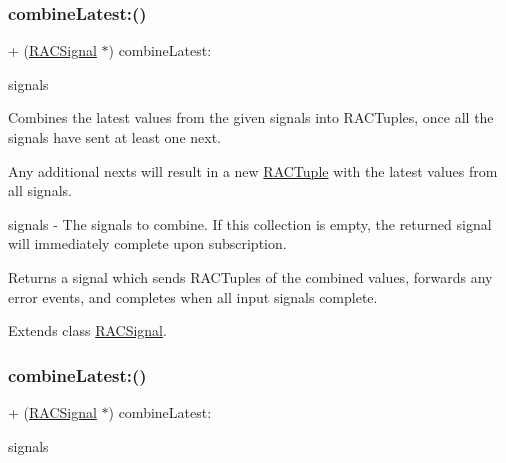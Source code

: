 \subsubsection{\texorpdfstring{combine\+Latest\+:()}{combineLatest:()}\hspace{0.1cm}{\footnotesize\ttfamily [2/3]}}
{\footnotesize\ttfamily + (\mbox{\hyperlink{interface_r_a_c_signal}{R\+A\+C\+Signal}} $\ast$) combine\+Latest\+: \begin{DoxyParamCaption}\item[{(id$<$ N\+S\+Fast\+Enumeration $>$)}]{signals }\end{DoxyParamCaption}}

Combines the latest values from the given signals into R\+A\+C\+Tuples, once all the signals have sent at least one {\ttfamily next}.

Any additional {\ttfamily next}s will result in a new \mbox{\hyperlink{interface_r_a_c_tuple}{R\+A\+C\+Tuple}} with the latest values from all signals.

signals -\/ The signals to combine. If this collection is empty, the returned signal will immediately complete upon subscription.

Returns a signal which sends R\+A\+C\+Tuples of the combined values, forwards any {\ttfamily error} events, and completes when all input signals complete. 

Extends class \mbox{\hyperlink{interface_r_a_c_signal_a8a7a563a48665fb1203e2b37db6e5e98}{R\+A\+C\+Signal}}.

\mbox{\label{category_r_a_c_signal_07_operations_08_a8a7a563a48665fb1203e2b37db6e5e98}} 
\subsubsection{\texorpdfstring{combine\+Latest\+:()}{combineLatest:()}\hspace{0.1cm}{\footnotesize\ttfamily [3/3]}}
{\footnotesize\ttfamily + (\mbox{\hyperlink{interface_r_a_c_signal}{R\+A\+C\+Signal}} $\ast$) combine\+Latest\+: \begin{DoxyParamCaption}\item[{(id$<$N\+S\+Fast\+Enumeration$>$)}]{signals }\end{DoxyParamCaption}}

